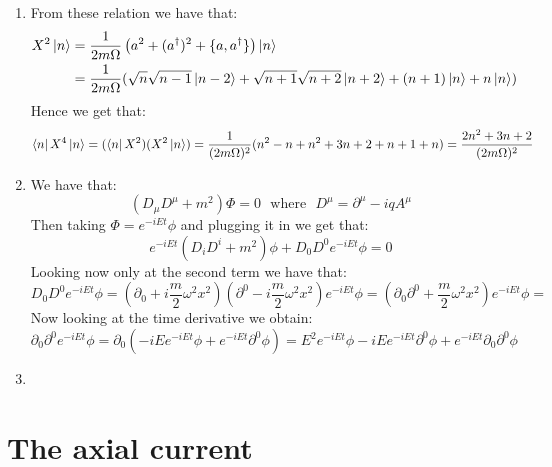\documentclass[10pt,a4paper]{article}
\begin{document}
\begin{enumerate}


\item From these relation we have that:
\begin{align*}
X^2 \ket{n} &= \frac{1}{2 m \Omega} \left( a^2 + (a^\dagger)^2 + \{a, a^\dagger\} \right)\ket{n} \\
&= \frac{1}{2m \Omega} (\sqrt{n}\sqrt{n-1} \ket{n-2} + \sqrt{n+1}\sqrt{n+2} \ket{n+2} + (n+1)\ket{n} + n\ket{n})
\end{align*}
Hence we get that:
\[
\bra{n} X^4 \ket{n} = (\bra{n} X^2)(X^2 \ket{n}) = \frac{1}{(2 m \Omega)^2} (n^2 - n + n^2 + 3n + 2 + n + 1 + n) = \frac{2n^2 + 3n + 2}{(2m \Omega)^2}
\]

\item We have that:
\[
(D_\mu D^\mu + m^2) \Phi = 0 \mbox{~~where~~} D^\mu = \partial^\mu - i q A^\mu
\]
Then taking $\Phi = e^{- i E t} \phi$ and plugging it in we get that:
\[
e^{-iEt} (D_i D^i + m^2) \phi + D_0D^0 e^{-iE t} \phi = 0
\]
Looking now only at the second term we have that:
\[
D_0D^0 e^{-iE t} \phi = (\partial_0 + i\frac{m}{2}\omega^2 x^2)(\partial^0 - i \frac{m}{2} \omega^2 x^2) e^{- i E t}\phi = (\partial_0 \partial^0 + \frac{m}{2} \omega^2 x^2) e^{-i E t} \phi = 
\]
Now looking at the time derivative we obtain:
\[
\partial_0\partial^0 e^{-iE t}\phi = \partial_0 (-i E e^{-iEt}\phi + e^{-iEt}\partial^0\phi) = E^2 e^{-iEt} \phi - i E e^{-iEt} \partial^0 \phi + e^{-iEt}\partial_0\partial^0 \phi 
\]

\item 

\end{enumerate}

\section{The axial current}
\end{document}
